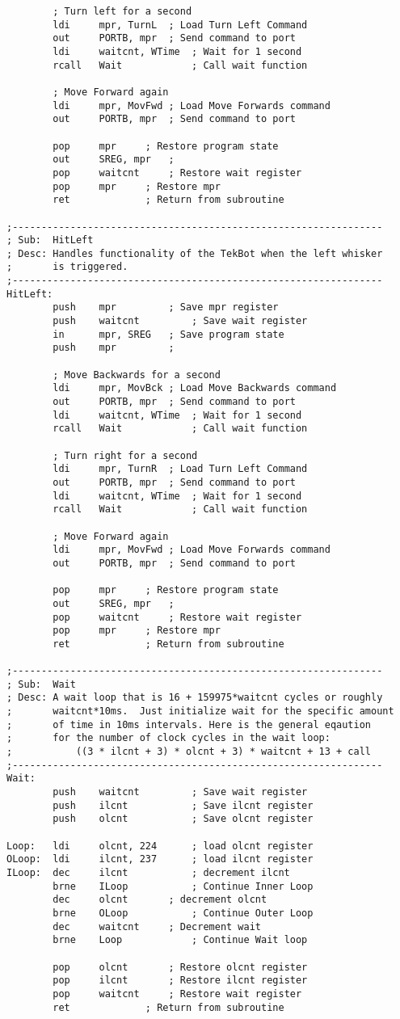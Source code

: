 \documentclass[12pt,letterpaper]{article}
\begin{document}
\begin{verbatim}
		; Turn left for a second
		ldi		mpr, TurnL	; Load Turn Left Command
		out		PORTB, mpr	; Send command to port
		ldi		waitcnt, WTime	; Wait for 1 second
		rcall	Wait			; Call wait function

		; Move Forward again	
		ldi		mpr, MovFwd	; Load Move Forwards command
		out		PORTB, mpr	; Send command to port

		pop		mpr		; Restore program state
		out		SREG, mpr	;
		pop		waitcnt		; Restore wait register
		pop		mpr		; Restore mpr
		ret				; Return from subroutine

;----------------------------------------------------------------
; Sub:	HitLeft
; Desc:	Handles functionality of the TekBot when the left whisker
;		is triggered.
;----------------------------------------------------------------
HitLeft:
		push	mpr			; Save mpr register
		push	waitcnt			; Save wait register
		in		mpr, SREG	; Save program state
		push	mpr			;

		; Move Backwards for a second
		ldi		mpr, MovBck	; Load Move Backwards command
		out		PORTB, mpr	; Send command to port
		ldi		waitcnt, WTime	; Wait for 1 second
		rcall	Wait			; Call wait function

		; Turn right for a second
		ldi		mpr, TurnR	; Load Turn Left Command
		out		PORTB, mpr	; Send command to port
		ldi		waitcnt, WTime	; Wait for 1 second
		rcall	Wait			; Call wait function

		; Move Forward again	
		ldi		mpr, MovFwd	; Load Move Forwards command
		out		PORTB, mpr	; Send command to port

		pop		mpr		; Restore program state
		out		SREG, mpr	;
		pop		waitcnt		; Restore wait register
		pop		mpr		; Restore mpr
		ret				; Return from subroutine

;----------------------------------------------------------------
; Sub:	Wait
; Desc:	A wait loop that is 16 + 159975*waitcnt cycles or roughly 
;		waitcnt*10ms.  Just initialize wait for the specific amount 
;		of time in 10ms intervals. Here is the general eqaution
;		for the number of clock cycles in the wait loop:
;			((3 * ilcnt + 3) * olcnt + 3) * waitcnt + 13 + call
;----------------------------------------------------------------
Wait:
		push	waitcnt			; Save wait register
		push	ilcnt			; Save ilcnt register
		push	olcnt			; Save olcnt register

Loop:	ldi		olcnt, 224		; load olcnt register
OLoop:	ldi		ilcnt, 237		; load ilcnt register
ILoop:	dec		ilcnt			; decrement ilcnt
		brne	ILoop			; Continue Inner Loop
		dec		olcnt		; decrement olcnt
		brne	OLoop			; Continue Outer Loop
		dec		waitcnt		; Decrement wait 
		brne	Loop			; Continue Wait loop	

		pop		olcnt		; Restore olcnt register
		pop		ilcnt		; Restore ilcnt register
		pop		waitcnt		; Restore wait register
		ret				; Return from subroutine
\end{verbatim}
\end{document}
